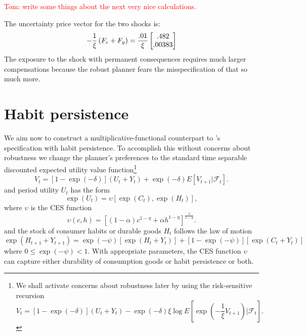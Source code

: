 \documentclass[12pt]{article}
\begin{document}
\textcolor{red}{Tom:  write some things about the next very nice calculations.}


The uncertainty price vector for the two shocks is:
\[
- {\frac {1} {\xi }}\left( F_c + F_y \right) =  {\frac {.01} \xi} \begin{bmatrix}   .482 \cr
 .00383 \end{bmatrix}
\]
The exposure to the shock with permanent consequences requires much larger compensations because the robust planner fears the misspecification of that
so much   more.




\section{Habit persistence}

We aim now to construct a multiplicative-functional counterpart to \citeauthor{hst:1999}'s specification with habit persistence.
To accomplish this without concerns about robustness  we change the planner's preferences to the standard time separable discounted expected
utility value function\footnote{We shall activate concerns about robustness later by using the risk-sensitive recursion 
\[
V_t = [1 - \exp(-\delta)]  (U_t + Y_t)   - \exp(-\delta)  \xi \log E\left[ \exp \left( - {\frac 1 \xi} V_{t+1} \right) \vert {\mathcal F}_t \right]
.\]}
\[ V_t  = [1 - \exp(-\delta)]  (U_t + Y_t)   + \exp(-\delta)   E\left[  V_{t+1} \vert {\mathcal F}_t \right] .
\]
and period utility $U_t$ has the form
\begin{equation}\label{eqn:UY}
\exp(U_t) =   \upsilon[ \exp(C_t), \exp(H_t)],
\end{equation}
where $\upsilon$ is the CES function
\[
\upsilon(c,h) = \left[ (1 - \alpha) c^{1-\eta} + \alpha h^{1 - \eta} \right]^{\frac 1 {1-\eta}}.
\]
and  the stock of consumer habits or  durable goods  $H_t$ follows the law of motion
 \begin{equation}\label{eqn:H_dynamics}
\exp(H_{t+1} + Y_{t+1})  = \exp(-\psi) \left[\exp(H_t + Y_t)\right] + \left[ 1 - \exp(-\psi) \right]  \left[\exp(C_t + Y_t)\right]
\end{equation}
where  $0 \le   \exp(-\psi)  < 1$.
With appropriate parameters, the CES function  $\upsilon$ can capture either  durability of consumption goods or
habit persistence or both.
\end{document}
